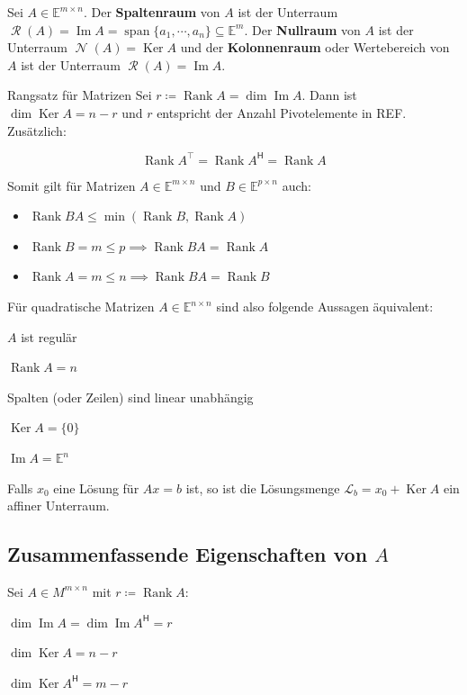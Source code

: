 \documentclass[a4paper,10pt]{article}
\DeclareMathOperator{\Rank}{Rank}
\DeclareMathOperator{\Image}{Im}
\DeclareMathOperator{\Columnspace}{\mathcal{R}}
\DeclareMathOperator{\Nullspace}{\mathcal{N}}
\DeclareMathOperator{\Kernel}{Ker}
\DeclareMathOperator{\Span}{span}
\newcommand*{\hermconj}{\mathsf{H}}
\def\E{\mathbb{E}}
\begin{document}
Sei $A \in \E^{m \times n}$. Der \textbf{Spaltenraum} von $A$ ist der Unterraum $\Columnspace(A) = \Image A = \Span \{ a_1, \cdots, a_n \} \subseteq \E^m$. Der \textbf{Nullraum} von $A$ ist der Unterraum $\Nullspace(A) = \Kernel A$ und der \textbf{Kolonnenraum} oder Wertebereich von $A$ ist der Unterraum $\Columnspace(A) = \Image A$.


\begin{subbox}{Rangsatz für Matrizen}
  Sei $r \coloneqq \Rank A = \dim \Image A$. Dann ist $\dim \Kernel A = n - r$ und $r$ entspricht der Anzahl Pivotelemente in REF. Zusätzlich:
  
  $$\Rank A^\top = \Rank A^\hermconj = \Rank A$$
\end{subbox}

Somit gilt für Matrizen $A \in \E^{m \times n}$ und $B \in \E^{p \times n}$ auch:

\begin{itemize}
  \item $\Rank BA \leq \min(\Rank B, \Rank A)$
  \item $\Rank B = m \leq p \implies \Rank BA = \Rank A$
  \item $\Rank A = m \leq n \implies \Rank BA = \Rank B$
\end{itemize}

Für quadratische Matrizen $A \in \E^{n \times n}$ sind also folgende Aussagen äquivalent:

\begin{rowlist}
  \item $A$ ist regulär
  \item $\Rank A = n$
  \item Spalten (oder Zeilen) sind linear unabhängig
  \item $\Kernel A = \{0\}$
  \item $\Image A = \E^n$
\end{rowlist}

Falls $x_0$ eine Lösung für $Ax = b$ ist, so ist die Lösungsmenge $\mathcal{L}_b = x_0 + \Kernel A$ ein affiner Unterraum.

\subsection{Zusammenfassende Eigenschaften von $A$}

Sei $A \in M^{m \times n}$ mit $r \coloneqq \Rank A$:

\begin{rowlist}
  \item $\dim \Image A = \dim \Image A^\hermconj = r$
  \item $\dim \Kernel A = n - r$
  \item $\dim \Kernel A^\hermconj = m - r$
\end{rowlist}
\end{document}
